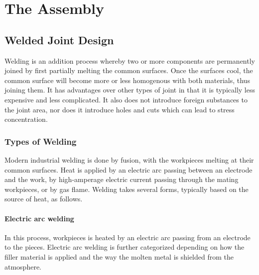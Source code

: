 \documentclass[
10pt,
a4paper,
openany,
svgnames,
]{book}
\begin{document}

\part{The Assembly}


\chapter{Welded Joint Design}

Welding is an addition process whereby two or more components are permanently joined by first partially melting the common surfaces. Once the surfaces cool, the common surface will become more or less homogenous with both materials, thus joining them. It has advantages over other types of joint in that it is typically less expensive and less complicated. It also does not introduce foreign substances to the joint area, nor does it introduce holes and cuts which can lead to stress concentration.

\section{Types of Welding}

Modern industrial welding is done by fusion, with the workpieces melting at their common surfaces. Heat is applied by an electric arc passing between an electrode and the work, by high-amperage electric current passing through the mating workpieces, or by gas flame. Welding takes several forms, typically based on the source of heat, as follows.

\subsection{Electric arc welding}

In this process, workpieces is heated by an electric arc passing from an electrode to the pieces. Electric arc welding is further categorized depending on how the filler material is applied and the way the molten metal is shielded from the atmosphere.
\end{document}
